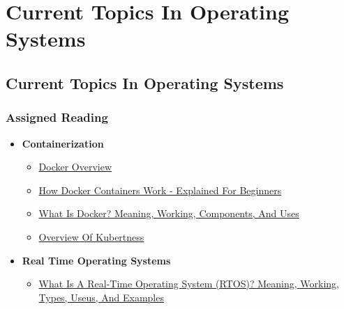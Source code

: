 \clearpage

\renewcommand{\ChapTitle}{Current Topics In Operating Systems}
\renewcommand{\SectionTitle}{Current Topics In Operating Systems}

\chapter{\ChapTitle}
\section{\SectionTitle}

\subsection{Assigned Reading}

\begin{itemize}
    \item \textbf{Containerization}
    \begin{itemize}
        \item \href{https://docs.docker.com/get-started/docker-overview/}{Docker Overview}
        \item \href{https://www.freecodecamp.org/news/how-docker-containers-work/}{How Docker Containers Work - Explained For Beginners}
        \item \href{https://www.spiceworks.com/tech/big-data/articles/what-is-docker/}{What Is Docker? Meaning, Working, Components, And Uses}
        \item \href{https://kubernetes.io/docs/concepts/overview/}{Overview Of Kubertness}
    \end{itemize}
    \item \textbf{Real Time Operating Systems}
    \begin{itemize}
        \item \href{https://www.spiceworks.com/tech/hardware/articles/what-is-rtos/}{What Is A Real-Time Operating System (RTOS)? Meaning, Working, Types, Useus, And Examples}
    \end{itemize}
\end{itemize}